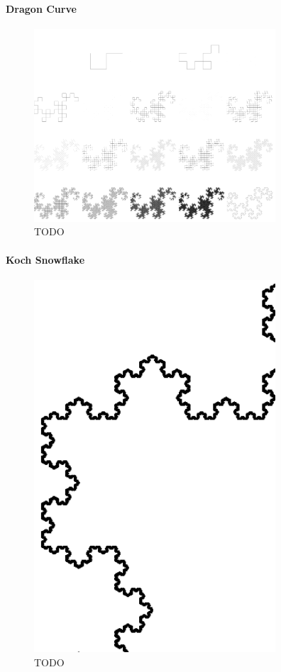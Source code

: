 \documentclass[11pt]{article}
\begin{document}
\paragraph{Dragon Curve}
\label{sec:org4cd762a}

\begin{figure}[htbp]
\centering
\includegraphics[width=9cm]{../Problems/Chaos/Spirals/dragon.png}
\caption{\label{dragon-turtle}TODO}
\end{figure}


\paragraph{Koch Snowflake}
\label{sec:orgfbd5e1d}
\begin{figure}[htbp]
\centering
\includegraphics[width=9cm]{../Problems/Chaos/Spirals/snowCurve.png}
\caption{\label{dragon-turtle}TODO}
\end{figure}
\end{document}
